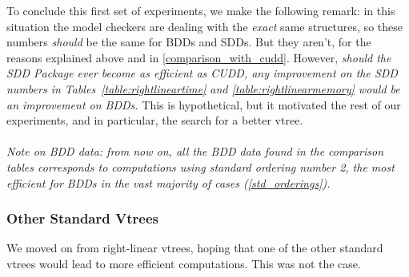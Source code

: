 \documentclass[11pt]{article}
\begin{document}
To conclude this first set of experiments, we make the following remark: in this situation the model checkers are dealing with the \textit{exact} same structures, so these numbers \textit{should }be the same for BDDs and SDDs. But they aren't, for the reasons explained above and in \ref{comparison_with_cudd}. However, \textit{should the SDD Package ever become as efficient as CUDD, any improvement on the SDD numbers in Tables~\ref{table:rightlineartime} and \ref{table:rightlinearmemory} would be an improvement on BDDs.} This is hypothetical, but it motivated the rest of our experiments, and in particular, the search for a better vtree.
\\\\
\textit{Note on BDD data: from now on, all the BDD data found in the comparison tables corresponds to computations using standard ordering number 2, the most efficient for BDDs in the vast majority of cases (\ref{std_orderings}).
}

\subsubsection{Other Standard Vtrees}

We moved on from right-linear vtrees, hoping that one of the other standard vtrees would lead to more efficient computations. This was not the case. 
\end{document}

